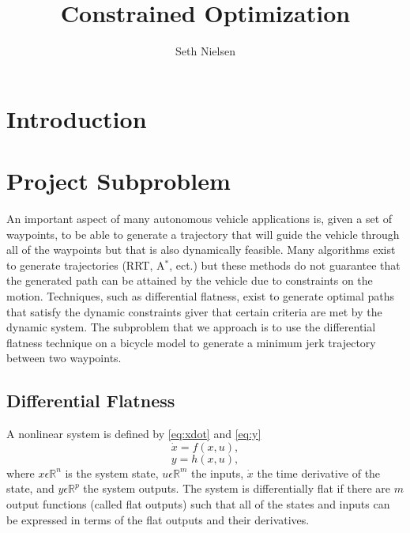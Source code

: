 \documentclass{article}
\begin{document}
\title{Constrained Optimization}
\author{Seth Nielsen}
\date{}
\maketitle

\section{Introduction}

\section{Project Subproblem}

An important aspect of many autonomous vehicle applications is, given a set of waypoints,
to be able to generate a trajectory that will guide the vehicle through all of the waypoints 
but that is also dynamically feasible. Many algorithms exist to generate trajectories
(RRT, A$^*$, ect.) but these methods do not guarantee that the generated path can be attained
by the vehicle due to constraints on the motion. Techniques, such as differential flatness,
exist to generate optimal paths that satisfy the dynamic constraints giver that certain criteria
are met by the dynamic system. The subproblem that we approach is to use the differential flatness 
technique on a bicycle model to generate a minimum jerk trajectory between two waypoints.

\subsection{Differential Flatness}
A nonlinear system is defined by \cref{eq:xdot} and \cref{eq:y}
\begin{equation}
  \dot{x} = f(x,u),
  \label{eq:xdot}
\end{equation}
\begin{equation}
  y = h(x,u),
  \label{eq:y}
\end{equation}
where $x \epsilon \mathbb{R}^n$ is the system state, $u \epsilon \mathbb{R}^m$ the inputs, $\dot{x}$ the time derivative of the state,
and $y \epsilon \mathbb{R}^p$ the system outputs. The system is differentially flat if there 
are $m$ output functions (called flat outputs) such that all of the states and inputs can be 
expressed in terms of the flat outputs and their derivatives.
\end{document}
